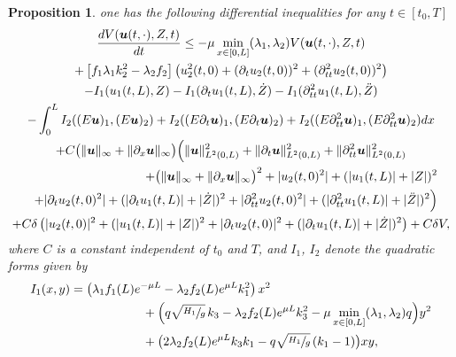 \documentclass[JEP,XML,SOM,Unicode]{cedram}
\newtheorem{prop}[thm]{Proposition}
\theoremstyle{definition}
\begin{document}
{\begin{prop}
one has the following differential inequalities for any $t\in[t_{0},T]$
\begin{multline}
\label{dVtot}
\frac{dV(\boldsymbol{u}(t,\cdot),Z,t)}{dt}\leq-\mu\min\limits_{x\in[0,L]}(\lambda_{1},\lambda_{2})V(\boldsymbol{u}(t,\cdot),Z,t)\\
+\left[f_{1}\lambda_{1}k_{2}^{2}-\lambda_{2}f_{2}\right]\left(u_{2}^{2}(t,0)+(\partial_{t}u_{2}(t,0))^{2}+(\partial_{tt}^{2}u_{2}(t,0))^{2}\right)\\
-I_{1}(u_{1}(t,L),Z)-I_{1}(\partial_{t}u_{1}(t,L),\dot Z)-I_{1}(\partial_{tt}^{2}u_{1}(t,L),\ddot Z)\\
-\int_{0}^{L}I_{2}((E\boldsymbol{u})_{1},(E\boldsymbol{u})_{2})+I_{2}((E\partial_{t}\boldsymbol{u})_{1},(E\partial_{t}\boldsymbol{u})_{2})+I_{2}((E\partial_{tt}^{2}\boldsymbol{u})_{1},(E\partial_{tt}^{2}\boldsymbol{u})_{2})dx\\
+C\bigl(\lVert \boldsymbol{u}\rVert_{\infty}+\lVert \partial_{x} \boldsymbol{u}\rVert_{\infty} \bigr) \Bigl(\lVert\boldsymbol{u} \rVert_{L^{2}(0,L)}^{2}+\lVert\partial_{t}\boldsymbol{u} \rVert_{L^{2}(0,L)}^{2}
+\lVert\partial_{tt}^{2}\boldsymbol{u} \rVert_{L^{2}(0,L)}^{2}\\
\shoveright{+\bigl(\lVert \boldsymbol{u}\rVert_{\infty}+\lVert \partial_{x} \boldsymbol{u}\rVert_{\infty}\bigr)^{{2}}
+|u_{2}(t,0)^{2}|+(|u_{1}(t,L)|+|Z|)^{2}}\\
\shoveright{+|\partial_{t}u_{2}(t,0)^{2}|+(|\partial_{t}u_{1}(t,L)|+|\dot Z|)^{2}
+|\partial_{tt}^{2}u_{2}(t,0)^{2}|
+(|\partial_{tt}^{2}u_{1}(t,L)|+|\ddot Z|)^{2}\Bigr)}\\
+C\delta\left(|u_{2}(t,0)|^{2}+(|u_{1}(t,L)|+|Z|)^{2}+|\partial_{t}u_{2}(t,0)|^{2}+(|\partial_{t}u_{1}(t,L)|+|\dot Z|)^{2}\right)+C\delta V,
\end{multline}
where $C$ is a constant independent of $t_{0}$ and $T$, and $I_{1}$, $I_{2}$ denote the quadratic forms given by
\begin{equation*}
\begin{split}
I_{1}(x,y)&=\left(\lambda_{1}f_{1}(L)e^{-\mu L}-\lambda_{2}f_{2}(L)e^{\mu L}k_{1}^{2}\right)x^{2}\\
&\hspace*{2.06cm}+{\Bigl(q\sqrt{\sfrac{H_{1}}{g}}\,k_{3}-\lambda_{2}f_{2}(L)e^{\mu L}k_{3}^{2}-\mu\min\limits_{x\in[0,L]}(\lambda_{1},\lambda_{2})q \Bigr)}y^{2}\\
&\hspace*{2.06cm}+\bigl(2\lambda_{2}f_{2}(L)e^{\mu L}k_{3}k_{1}-{q\sqrt{\sfrac{H_{1}}{g}}}\,(k_{1}-1)\bigr)xy,\\

\end{split}
\end{equation*}
\end{prop}}
\end{document}
